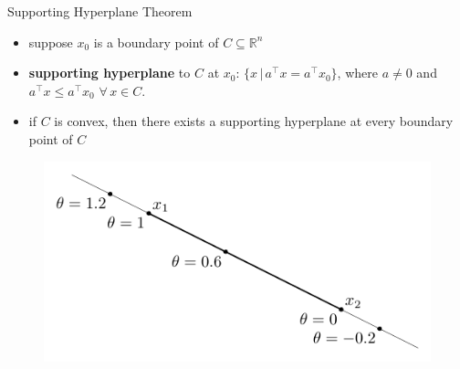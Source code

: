 \documentclass[10pt]{beamer}
\theoremstyle{definition}
\begin{document}
\begin{frame}{Supporting Hyperplane Theorem}

\begin{itemize}
  \item suppose $x_0$ is a boundary point of $C\subseteq\mathbb{R}^n$
  \item {\bf supporting hyperplane} to $C$ at $x_0$: $\{x\,|\,a^\top x = a^\top x_0\}$, where $a\ne 0$ and $a^\top x\leqslant a^\top x_0$ $\forall\,x\in C$. 
  \item if $C$ is convex, then there exists a supporting hyperplane at every boundary point of $C$ 
\end{itemize}
\begin{figure}[!htbp]
  \centering
  \includegraphics[scale=0.91,page=21]{fig/note06/02.pdf}
\end{figure}

\end{frame}
\end{document}
